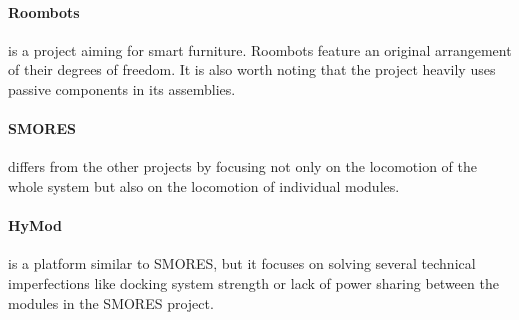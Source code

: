 \paragraph{Roombots} \cite{bonardi_locomotion_2012} is a project aiming for
smart furniture. Roombots feature an original arrangement of their degrees of
freedom. It is also worth noting that the project heavily uses passive
components in its assemblies.

\paragraph{SMORES} \cite{davey_emulating_2012} differs from the other projects
by focusing not only on the locomotion of the whole system but also on the
locomotion of individual modules.

\paragraph{HyMod} \cite{gros_hymod:_2018} is a platform similar to SMORES, but
it focuses on solving several technical imperfections like docking system
strength or lack of power sharing between the modules in the SMORES project.
